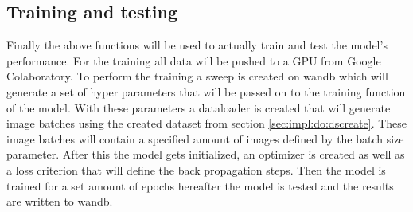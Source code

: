 	\subsection{Training and testing}
		Finally the above functions will be used to actually train and test the model's performance. 
	For the training all data will be pushed to a GPU from Google Colaboratory.
		To perform the training a sweep is created on wandb which will generate a set of hyper parameters that will be passed on to the training function of the model. With these parameters a dataloader is created that will generate image batches using the created dataset from section \ref{sec:impl:do:dscreate}. These image batches will contain a specified amount of images defined by the batch size parameter. After this the model gets initialized, an optimizer is created as well as a loss criterion that will define the back propagation steps. Then the model is trained for a set amount of epochs hereafter the model is tested and the results are written to wandb.
		
		



